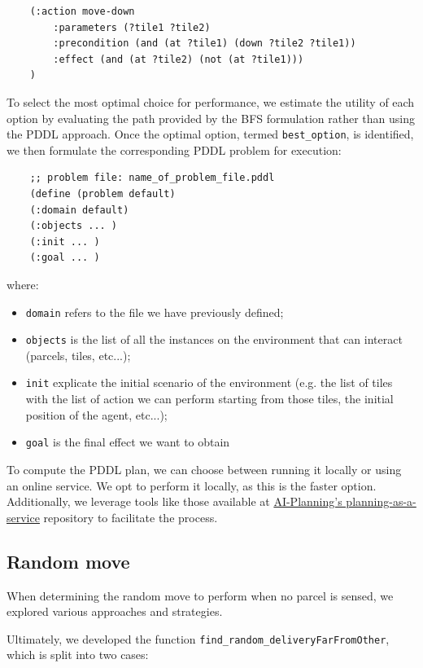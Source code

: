 \documentclass[10pt]{article}
\begin{document}
\begin{verbatim}
    (:action move-down
        :parameters (?tile1 ?tile2)
        :precondition (and (at ?tile1) (down ?tile2 ?tile1))
        :effect (and (at ?tile2) (not (at ?tile1)))
    )
\end{verbatim}

To select the most optimal choice for performance, we estimate the utility of each option by evaluating the path provided by the BFS formulation rather than using the PDDL approach. Once the optimal option, termed \texttt{best\_option}, is identified, we then formulate the corresponding PDDL problem for execution:

\begin{verbatim}
    ;; problem file: name_of_problem_file.pddl
    (define (problem default)
    (:domain default)
    (:objects ... )
    (:init ... )
    (:goal ... ) 
\end{verbatim}

where:

\begin{itemize}
    \item \texttt{domain} refers to the file we have previously defined;
    \item  \texttt{objects} is the list of all the instances on the environment that can interact (parcels, tiles, etc...);
    \item \texttt{init} explicate the initial scenario of the environment (e.g. the list of tiles with the list of action we can perform starting from those tiles, the initial position of the agent, etc...);
    \item \texttt{goal} is the final effect we want to obtain 
\end{itemize}

To compute the PDDL plan, we can choose between running it locally or using an online service. We opt to perform it locally, as this is the faster option. Additionally, we leverage tools like those available at \href{https://github.com/AI-Planning/planning-as-a-service}{AI-Planning's planning-as-a-service} repository to facilitate the process.
 

\subsection{Random move}

When determining the random move to perform when no parcel is sensed, we explored various approaches and strategies. 

Ultimately, we developed the function \texttt{find\_random\_deliveryFarFromOther}, which is split into two cases:
\end{document}
